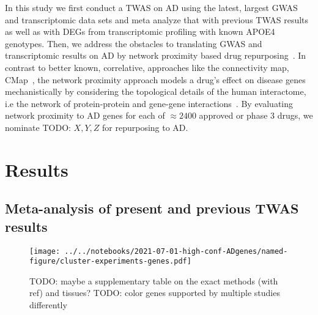 \documentclass[letterpaper]{article}
\begin{document}
In this study we first conduct a TWAS on AD using the latest, largest GWAS and
transcriptomic data sets and meta analyze that with previous TWAS results as
well as with DEGs from transcriptomic profiling with known APOE4 genotypes.
Then, we address the obstacles to translating GWAS and transcriptomic results
on AD by network proximity based drug repurposing~\citep{Cheng2018}.  In
contrast to better known, correlative, approaches like the connectivity map,
CMap~\citep{Lamb2006}, the network proximity approach models a drug's effect
on disease genes mechanistically by considering the topological details of the
human interactome, i.e the network of protein-protein and gene-gene
interactions~\citep{Guney2016,Barabasi2011}.  By evaluating network proximity
to AD genes for each of $\approx 2400$ approved or phase 3 drugs, we nominate
TODO: $X, Y, Z$ for repurposing to AD.

\section{Results}

\subsection{Meta-analysis of present and previous TWAS results}

\begin{figure}
\texttt{[image: ../../notebooks/2021-07-01-high-conf-ADgenes/named-figure/cluster-experiments-genes.pdf]}
\caption{
  TODO: maybe a supplementary table on the exact methods (with ref) and
  tissues?  TODO: color genes supported by multiple studies differently
}
\label{fig:twas-clustermap}
\end{figure}
\end{document}
